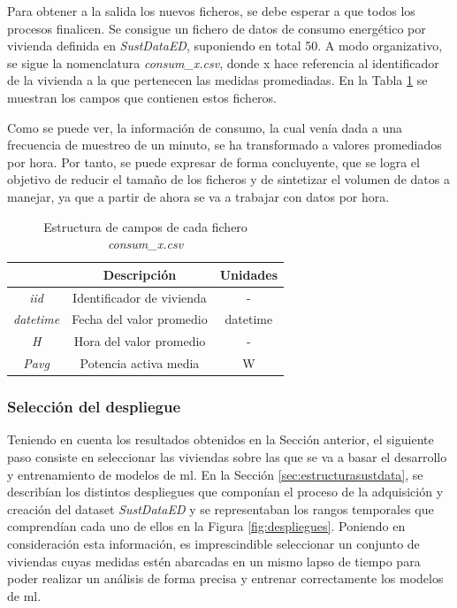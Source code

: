 \vspace{3mm}

Para obtener a la salida los nuevos ficheros, se debe esperar a que todos los procesos finalicen. Se consigue un fichero de datos de consumo energético por vivienda definida en \textit{SustDataED}, suponiendo en total 50. A modo organizativo, se sigue la nomenclatura \textit{consum\_x.csv}, donde x hace referencia al identificador de la vivienda a la que pertenecen las medidas promediadas. En la Tabla \ref{tab:consum} se muestran los campos que contienen estos ficheros.

\vspace{3mm}

Como se puede ver, la información de consumo, la cual venía dada a una frecuencia de muestreo de un minuto, se ha transformado a valores promediados por hora. Por tanto, se puede expresar de forma concluyente, que se logra el objetivo de reducir el tamaño de los ficheros y de sintetizar el volumen de datos a manejar, ya que a partir de ahora se va a trabajar con datos por hora.

\vspace{3mm}

\begin{table}[h!]
  \centering
  \begin{tabular}{|c|c|c|}
  \hline
  \rowcolor[HTML]{AAAAAA} 
  \multicolumn{1}{|c|}{\cellcolor[HTML]{AAAAAA}Campo} & \multicolumn{1}{c|}{\cellcolor[HTML]{AAAAAA}Descripción} & Unidades \\ \hline
  \textit{iid} & Identificador de vivienda & - \\ \hline
  \textit{datetime} & Fecha del valor promedio & datetime \\ \hline
  \textit{H} & Hora del valor promedio & - \\ \hline
  \textit{Pavg} & Potencia activa media & W \\ \hline
  \end{tabular}
  \caption{Estructura de campos de cada fichero \textit{consum\_x.csv}}
  \label{tab:consum}
\end{table}

\subsubsection{Selección del despliegue}

Teniendo en cuenta los resultados obtenidos en la Sección anterior, el siguiente paso consiste en seleccionar las viviendas sobre las que se va a basar el desarrollo y entrenamiento de modelos de \gls{ml}. En la Sección \ref{sec:estructurasustdata}, se describían los distintos despliegues que componían el proceso de la adquisición y creación del dataset \textit{SustDataED} y se representaban los rangos temporales que comprendían cada uno de ellos en la Figura \ref{fig:despliegues}. Poniendo en consideración esta información, es imprescindible seleccionar un conjunto de viviendas cuyas medidas estén abarcadas en un mismo lapso de tiempo para poder realizar un análisis de forma precisa y entrenar correctamente los modelos de \gls{ml}. 

